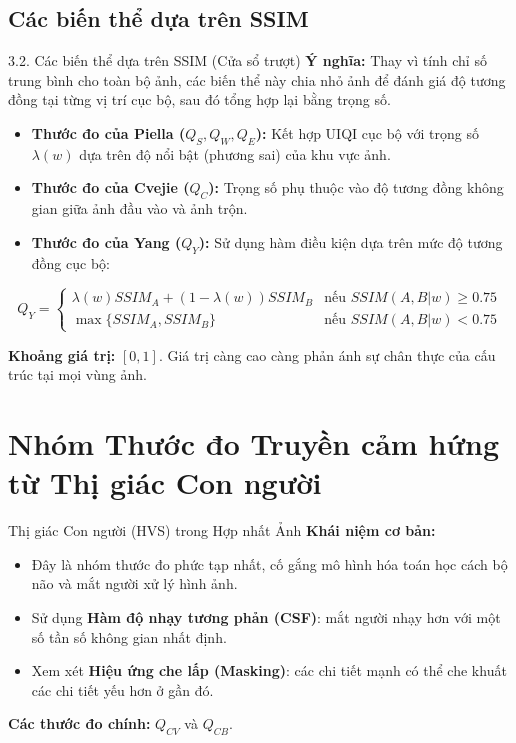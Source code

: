 \documentclass{beamer}
\begin{document}
\subsection{Các biến thể dựa trên SSIM}
\begin{frame}{3.2. Các biến thể dựa trên SSIM (Cửa sổ trượt)}
    \textbf{Ý nghĩa:} Thay vì tính chỉ số trung bình cho toàn bộ ảnh, các biến thể này chia nhỏ ảnh để đánh giá độ tương đồng tại từng vị trí cục bộ, sau đó tổng hợp lại bằng trọng số.

    \begin{itemize}
        \item \textbf{Thước đo của Piella ($Q_S, Q_W, Q_E$):} Kết hợp UIQI cục bộ với trọng số $\lambda(w)$ dựa trên độ nổi bật (phương sai) của khu vực ảnh.
        \item \textbf{Thước đo của Cvejie ($Q_C$):} Trọng số phụ thuộc vào độ tương đồng không gian giữa ảnh đầu vào và ảnh trộn.
        \item \textbf{Thước đo của Yang ($Q_Y$):} Sử dụng hàm điều kiện dựa trên mức độ tương đồng cục bộ:
    \end{itemize}

    \begin{equation}
    Q_Y =
    \begin{cases}
      \lambda(w) SSIM_A + (1-\lambda(w)) SSIM_B & \text{nếu } SSIM(A,B|w) \ge 0.75 \\
      \max \{SSIM_A, SSIM_B\} & \text{nếu } SSIM(A,B|w) < 0.75
   \end{cases}
   \end{equation}

   \vspace{0.2cm}
   \textbf{Khoảng giá trị:} $[0, 1]$. Giá trị càng cao càng phản ánh sự chân thực của cấu trúc tại mọi vùng ảnh.
\end{frame}


\section{Nhóm Thước đo Truyền cảm hứng từ Thị giác Con người}

\begin{frame}{Thị giác Con người (HVS) trong Hợp nhất Ảnh}
    \textbf{Khái niệm cơ bản:}
    \begin{itemize}
        \item Đây là nhóm thước đo phức tạp nhất, cố gắng mô hình hóa toán học cách bộ não và mắt người xử lý hình ảnh.
        \item Sử dụng \textbf{Hàm độ nhạy tương phản (CSF)}: mắt người nhạy hơn với một số tần số không gian nhất định.
        \item Xem xét \textbf{Hiệu ứng che lấp (Masking)}: các chi tiết mạnh có thể che khuất các chi tiết yếu hơn ở gần đó.
    \end{itemize}
    
    \vspace{0.4cm}
    \textbf{Các thước đo chính:} $Q_{CV}$ và $Q_{CB}$.
\end{frame}
\end{document}
